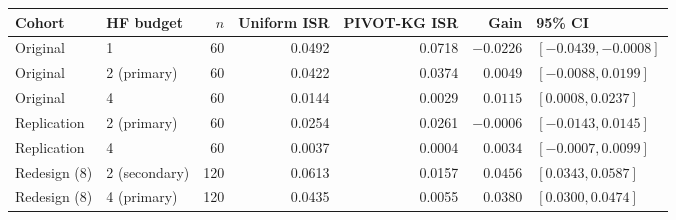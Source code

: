 \begin{tabular}{@{}llrrrrl@{}}
\toprule
Cohort & HF budget & $n$ & Uniform ISR & PIVOT-KG ISR & Gain & 95\% CI \\
\midrule
Original & 1 & 60 & 0.0492 & 0.0718 & $-0.0226$ & $[-0.0439,-0.0008]$ \\
Original & 2 (primary) & 60 & 0.0422 & 0.0374 & $0.0049$ & $[-0.0088,0.0199]$ \\
Original & 4 & 60 & 0.0144 & 0.0029 & $0.0115$ & $[0.0008,0.0237]$ \\
Replication & 2 (primary) & 60 & 0.0254 & 0.0261 & $-0.0006$ & $[-0.0143,0.0145]$ \\
Replication & 4 & 60 & 0.0037 & 0.0004 & $0.0034$ & $[-0.0007,0.0099]$ \\
Redesign (8) & 2 (secondary) & 120 & 0.0613 & 0.0157 & $0.0456$ & $[0.0343,0.0587]$ \\
Redesign (8) & 4 (primary) & 120 & 0.0435 & 0.0055 & $0.0380$ & $[0.0300,0.0474]$ \\
\bottomrule
\end{tabular}

